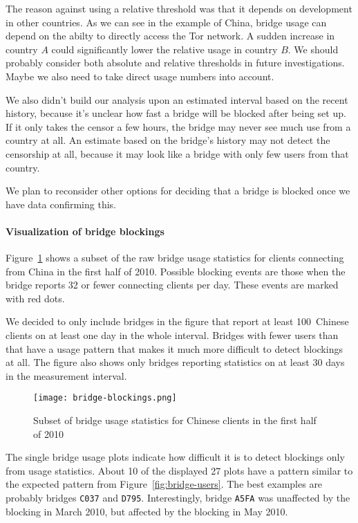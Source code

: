 \documentclass{article}
\begin{document}
The reason against using a relative threshold was that it depends on
development in other countries.
As we can see in the example of China, bridge usage can depend on the
abilty to directly access the Tor network.
A sudden increase in country $A$ could significantly lower the relative
usage in country $B$.
We should probably consider both absolute and relative thresholds in
future investigations.
Maybe we also need to take direct usage numbers into account.

We also didn't build our analysis upon an estimated interval based on the
recent history, because it's unclear how fast a bridge will be blocked
after being set up.
If it only takes the censor a few hours, the bridge may never see much use
from a country at all.
An estimate based on the bridge's history may not detect the censorship at
all, because it may look like a bridge with only few users from that
country.

We plan to reconsider other options for deciding that a bridge is blocked
once we have data confirming this.

\paragraph{Visualization of bridge blockings}

Figure~\ref{fig:bridge-blockings} shows a subset of the raw bridge usage
statistics for clients connecting from China in the first half of 2010.
Possible blocking events are those when the bridge reports 32 or fewer
connecting clients per day.
These events are marked with red dots.

We decided to only include bridges in the figure that report at least
100~Chinese clients on at least one day in the whole interval.
Bridges with fewer users than that have a usage pattern that makes it much
more difficult to detect blockings at all.
The figure also shows only bridges reporting statistics on at least 30
days in the measurement interval.

\begin{figure}[t]
\texttt{[image: bridge-blockings.png]}
\caption{Subset of bridge usage statistics for Chinese clients in the
first half of 2010}
\label{fig:bridge-blockings}
\end{figure}

The single bridge usage plots indicate how difficult it is to detect
blockings only from usage statistics.
About 10 of the displayed 27 plots have a pattern similar to the expected
pattern from Figure~\ref{fig:bridge-users}.
The best examples are probably bridges \verb+C037+ and \verb+D795+.
Interestingly, bridge \verb+A5FA+ was unaffected by the blocking in March
2010, but affected by the blocking in May 2010.
\end{document}
